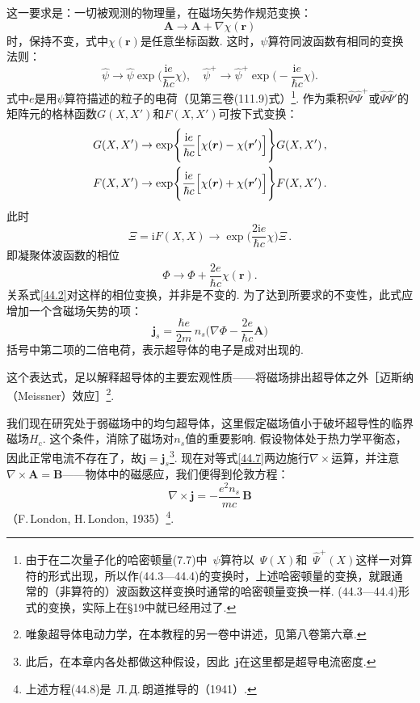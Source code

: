 这一要求是：一切被观测的物理量，在磁场矢势作规范变换：
\begin{equation}
\bm A\longrightarrow\bm A + \nabla\chi(\bm r)
\label{44.3}
\end{equation}
时，保持不变，式中$\chi(\bm r)$是任意坐标函数. 这时，$\psi$算符同波函数有相同的变换法则：
\begin{equation}
\hat\psi\longrightarrow\hat\psi\exp\Biggl(\frac{\mathrm ie}{\hbar c}\chi\Biggr),\quad
\hat\psi^{+}\longrightarrow\hat\psi^{+}\exp\Biggl(-\frac{\mathrm ie}{\hbar c}\chi\Biggr).
\label{44.4}
\end{equation}
式中$e$是用$\psi$算符描述的粒子的电荷（见第三卷(111.9)式）\footnote{由于在二次量子化的哈密顿量(7.7)中~$\psi$算符以~$\hat\Psi(X)$和~$\hat\Psi^{+}(X)$这样一对算符的形式出现，所以作(44.3—44.4)的变换时，上述哈密顿量的变换，就跟通常的（非算符的）波函数这样变换时通常的哈密顿量变换一样. (44.3—44.4)形式的变换，实际上在§19中就已经用过了.}. 作为乘积$\hat\Psi\hat\Psi^{+}$或$\hat\Psi\hat\Psi'$的矩阵元的格林函数$G(X,X')$和$F(X,X')$可按下式变换：
\begin{equation}
\begin{aligned}
G(X,X') &\to \exp\Biggl\{\frac{\mathrm ie}{\hbar c}\Bigl[\chi(\bm r)-\chi(\bm r')\Bigr]\Biggr\}G(X,X')\,,\\
F(X,X') &\to \exp\Biggl\{\frac{\mathrm ie}{\hbar c}\Bigl[\chi(\bm r)+\chi(\bm r')\Bigr]\Biggr\}F(X,X')\,.
\end{aligned}
\label{44.5}
\end{equation}
此时
\begin{equation*}
\Xi = \mathrm iF(X,X)\longrightarrow\exp\Biggl(\frac{2\mathrm ie}{\hbar c}\chi\Biggr)\Xi\,.
\end{equation*}
即凝聚体波函数的相位
\begin{equation}
\Phi\longrightarrow\Phi + \frac{2e}{\hbar c}\chi(\bm r).
\label{44.6}
\end{equation}
关系式\eqref{44.2}对这样的相位变换，并非是不变的. 为了达到所要求的不变性，此式应增加一个含磁场矢势的项：
\begin{equation}
\bm j_s = \frac{\hbar e}{2m}\,n_s\Biggl(\nabla\Phi - \frac{2e}{\hbar c}\bm A\Biggr)
\label{44.7}
\end{equation}
括号中第二项的二倍电荷，表示超导体的电子是成对出现的.

这个表达式，足以解释超导体的主要宏观性质——将磁场排出超导体之外［迈斯纳（Meissner）效应］\footnote{唯象超导体电动力学，在本教程的另一卷中讲述，见第八卷第六章.}.

我们现在研究处于弱磁场中的均匀超导体，这里假定磁场值小于破坏超导性的临界磁场$H_{\mathrm c}$. 这个条件，消除了磁场对$n_s$值的重要影响. 假设物体处于热力学平衡态，因此正常电流不存在了，故$\bm j=\bm j_s$\footnote{此后，在本章内各处都做这种假设，因此~$\bm j$在这里都是超导电流密度.}. 现在对等式\eqref{44.7}两边施行$\nabla\times$运算，并注意$\nabla\times\bm A=\bm B$——物体中的磁感应，我们便得到伦敦方程：
\begin{equation}
\nabla\times\bm j = -\frac{e^2n_s}{mc}\,\bm B
\label{44.8}
\end{equation}
（F.\,London, H.\,London, 1935）\footnote{上述方程(44.8)是~Л.\,Д.\,朗道推导的（1941）.}.

